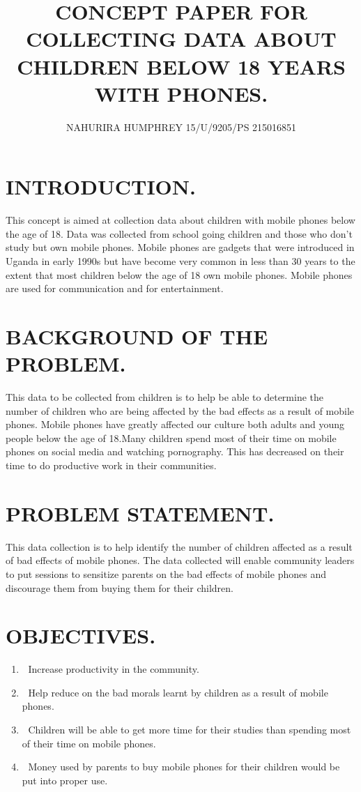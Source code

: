\documentclass {article}
\begin{document}
\title {CONCEPT PAPER FOR COLLECTING DATA ABOUT CHILDREN BELOW 18 YEARS WITH PHONES.}

\author  { NAHURIRA HUMPHREY     15/U/9205/PS      215016851}
\maketitle
\section {INTRODUCTION.}
This concept is aimed at collection data about children with mobile phones below the age of 18.
Data was collected from school going children and those who don’t study but own mobile phones.
Mobile phones are gadgets that were introduced in Uganda in early 1990s but have become very common in less than 30 years to the extent that most children below the age of 18 own mobile phones.
Mobile phones are used for communication and for entertainment.
\section {BACKGROUND OF THE PROBLEM.}
This data to be collected from children is to help be able to determine the number of children who are being affected by the bad effects as a result of mobile phones. Mobile phones have greatly affected our culture both adults and young people below the age of 18.Many children spend most of their time on mobile phones on social media and watching pornography. This has decreased on their time to do productive work in their communities.
\section{PROBLEM STATEMENT. }This data collection is to help identify the number of children affected as a result of bad effects of mobile phones. The data collected will enable community leaders to put sessions to sensitize parents on the bad effects of mobile phones and discourage them from buying them for their children.
\section{OBJECTIVES.}
\begin{enumerate}
\item	Increase productivity in the community.
\item	Help reduce on the bad morals learnt by children as a result of mobile phones.
\item	Children will be able to get more time for their studies than spending most of their time on mobile phones.
\item	Money used by parents to buy mobile phones for their children would be put into proper use.
\end {enumerate}
\end{document}
